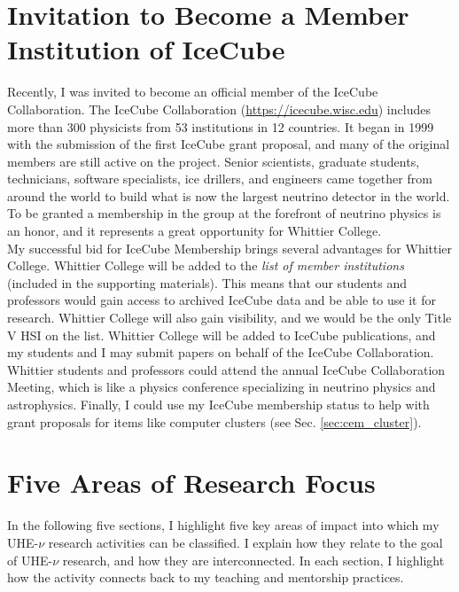 \documentclass[../../../main.tex]{subfiles}
\begin{document}
\section{Invitation to Become a Member Institution of IceCube}
\label{sec:invite}

Recently, I was invited to become an official member of the IceCube Collaboration.  The IceCube Collaboration (\url{https://icecube.wisc.edu}) includes more than 300 physicists from 53 institutions in 12 countries. It began in 1999 with the submission of the first IceCube grant proposal, and many of the original members are still active on the project.  Senior scientists, graduate students, technicians, software specialists, ice drillers, and engineers came together from around the world to build what is now the largest neutrino detector in the world.  To be granted a membership in the group at the forefront of neutrino physics is an honor, and it represents a great opportunity for Whittier College.
\\
\vspace{0.25cm}
My successful bid for IceCube Membership brings several advantages for Whittier College.  Whittier College will be added to the \textit{list of member institutions} (included in the supporting materials).  This means that our students and professors would gain access to archived IceCube data and be able to use it for research.  Whittier College will also gain visibility, and we would be the only Title V HSI on the list.  Whittier College will be added to IceCube publications, and my students and I may submit papers on behalf of the IceCube Collaboration.  Whittier students and professors could attend the annual IceCube Collaboration Meeting, which is like a physics conference specializing in neutrino physics and astrophysics.  Finally, I could use my IceCube membership status to help with grant proposals for items like computer clusters (see Sec. \ref{sec:cem_cluster}).

\section{Five Areas of Research Focus}
\label{sec:neutrino}

In the following five sections, I highlight five key areas of impact into which my UHE-$\nu$ research activities can be classified.  I explain how they relate to the goal of UHE-$\nu$ research, and how they are interconnected.  In each section, I highlight how the activity connects back to my teaching and mentorship practices.
\end{document}
